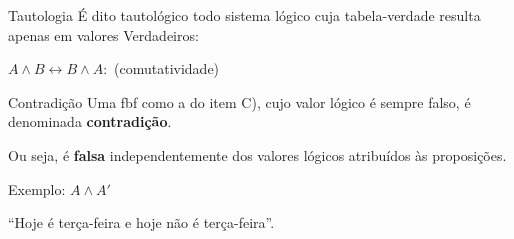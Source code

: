 \documentclass[aspectratio=169]{beamer}
\begin{document}
\begin{frame}{Tautologia}
    É dito tautológico todo sistema lógico cuja tabela-verdade resulta apenas em valores Verdadeiros:

    $A \wedge B \leftrightarrow B \wedge A: $ (comutatividade)

    \begin{table}[hb]
    \end{table}

\end{frame}

\begin{frame}{Contradição}
    Uma fbf como a do item C), cujo valor lógico é sempre falso, é denominada \textbf{contradição}.
    \vspace{5mm}

    Ou seja, é \textbf{falsa} independentemente dos valores lógicos atribuídos às proposições.
    \vspace{5mm}

    Exemplo: $ A \wedge A' $
    \vspace{5mm}

    “Hoje é terça-feira e hoje não é terça-feira”.

\end{frame}
\end{document}
